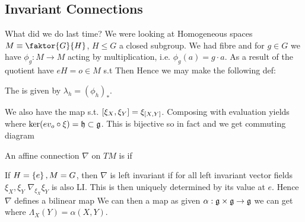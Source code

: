 \documentclass{article}
\begin{document}
\subsection{Invariant Connections} 
What did we do last time? We were looking at Homogeneous spaces $M \equiv \faktor{G}{H}$, $H\leq G$ a closed subgroup. We had fibre 
and for $g \in G$ we have $\phi_g : M \to M$ acting by multiplication, i.e. $\phi_g(a) = g \cdot a$. As a result of the quotient have $eH = o \in M$ s.t 
Then 
Hence we may make the following def:
\begin{definition}
	The 
	is given by $\lambda_h = (\phi_h)_\ast$. 
\end{definition}
We also have the map
s.t. $\comm[\xi_X]{\xi_Y} = \xi_{\comm[X]{Y}}$. Composing with evaluation yields
where $\ker(ev_o \circ \xi) = \mf{h} \subset \mf{g}$. This is bijective so in fact 
and we get commuting diagram 
\begin{center}
\end{center}

\begin{definition}
	An affine connection $\nabla$ on $TM$ is  if 
\end{definition}

If $H = \pbrace{e}, M=G$, then $\nabla$ is left invariant if for all left invariant vector fields $\xi_X,\xi_Y$ $\nabla_{\xi_X} \xi_Y$ is also LI. This is then uniquely determined by its value at $e$. Hence $\nabla $ defines a bilinear map 
We can then  a map as given $\alpha : \mf{g} \times \mf{g} \to \mf{g}$ we can get 
where $\Lambda_X(Y) = \alpha(X,Y)$. 
\end{document}
